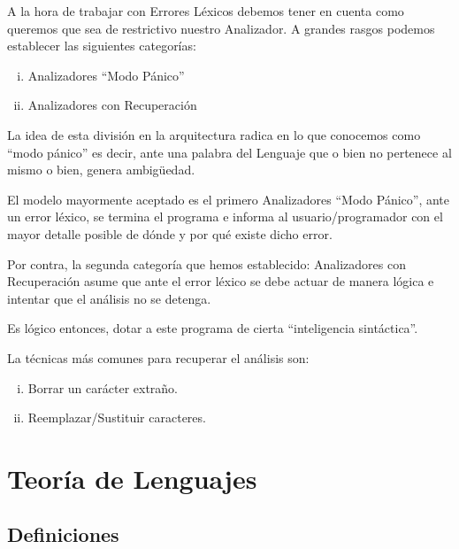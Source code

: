 {
 A la hora de trabajar con Errores Léxicos debemos tener en cuenta como queremos que sea de restrictivo nuestro Analizador. A grandes rasgos podemos establecer las siguientes categorías:

\begin{enumerate}[i.]

\item Analizadores ``Modo Pánico''

\item Analizadores con Recuperación

\end{enumerate}

La idea de esta división en la arquitectura radica en lo que conocemos como ``modo pánico'' es decir, ante una palabra del Lenguaje que o bien no pertenece al mismo o bien, genera ambigüedad.

El modelo mayormente aceptado es el primero Analizadores ``Modo Pánico'', ante un error léxico, se termina el programa e informa al usuario/programador con el mayor detalle posible de dónde y por qué existe dicho error.

Por contra, la segunda categoría que hemos establecido: Analizadores con Recuperación asume que ante el error léxico se debe actuar de manera lógica e intentar que el análisis no se detenga.

Es lógico entonces, dotar a este programa de cierta ``inteligencia sintáctica''.

La técnicas más comunes para recuperar el análisis son:

\begin{enumerate}[i.]

\item Borrar un carácter extraño.

\item Reemplazar/Sustituir caracteres.

\end{enumerate}

}




\section{Teoría de Lenguajes}

\subsection{Definiciones}\label{subsec:Lang}

